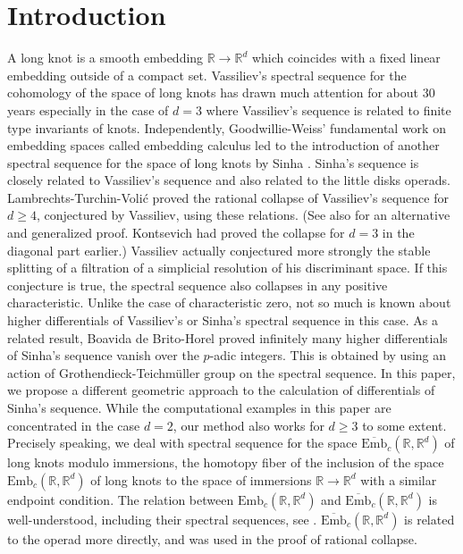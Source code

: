 \documentclass[reqno]{amsart}
\theoremstyle{definition}
\theoremstyle{plain}
\newcommand{\Embbar}{\overline{\mathrm{Emb}}}
\newcommand{\Emb}{\mathrm{Emb}}
\newcommand{\RR}{\mathbb{R}}
\begin{document}
\section{Introduction}
A long knot is a smooth embedding $\RR\to \RR^d$ which coincides with a fixed linear embedding  outside of a compact set. Vassiliev's spectral sequence for the cohomology of the space of long knots \cite{vassiliev} has  drawn much attention for about 30 years especially in the case of $d=3$ where Vassiliev's sequence is related to finite type invariants of knots. Independently, Goodwillie-Weiss' fundamental work on embedding spaces called embedding calculus \cite{GK,weiss} led to the introduction of another spectral sequence for the space of long knots by Sinha \cite{sinha, sinha1}.  Sinha's  sequence is closely related to Vassiliev's sequence  and also related to the little disks operads. Lambrechts-Turchin-Voli\'c \cite{LTV} proved the rational collapse of Vassiliev's sequence for $d\geq 4$, conjectured by Vassiliev, using these relations. (See also \cite{AT} for an alternative and generalized proof. Kontsevich \cite{kontsevich1} had proved the collapse for $d=3$ in the diagonal part earlier.) Vassiliev actually conjectured more strongly the stable splitting of a filtration of a simplicial resolution of his discriminant space. If this conjecture is true, the spectral sequence also collapses in any positive characteristic. Unlike the case of characteristic zero, not so much is known about higher differentials of Vassiliev's or Sinha's spectral sequence in this case.
As a related result,  Boavida de Brito-Horel \cite{BH}  proved  infinitely many higher differentials of Sinha's sequence vanish over the $p$-adic integers. This is obtained by using an action  of Grothendieck-Teichm\"uller group on the spectral sequence. In this paper, we propose a different geometric approach to the calculation of differentials of Sinha's sequence. While the computational examples in this paper are concentrated in the case $d=2$, our method also works for $d\geq 3$ to some extent. \\
 \indent Precisely speaking, we deal with spectral sequence for the space $\Embbar_c(\RR,\RR^d)$ of long knots modulo immersions, the  homotopy fiber of the inclusion of the  space $\Emb_c(\RR,\RR^d)$ of long knots to the space of immersions $\RR\to \RR^d$ with a similar endpoint condition. The relation between $\Emb_c(\RR,\RR^d)$ and $\Embbar_c(\RR,\RR^d)$ is well-understood, including their spectral sequences, see \cite{sinha1, turchin}.  $\Embbar_c(\RR,\RR^d)$ is related to the operad more directly, and was used in the proof of rational collapse.  
\end{document}
